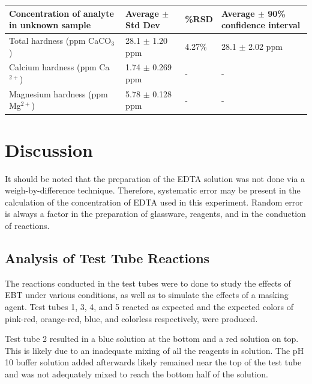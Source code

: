 \documentclass{article}
\begin{document}
\begin{center}
        \begin{tabular}{|L|L|L|L|}
                \hline
                \textbf{Concentration of analyte in unknown sample} &
                \textbf{Average \hspace{2cm}$\pm$ Std Dev} & \textbf{\%RSD} &
                \textbf{Average $\pm$ 90\% confidence interval} \\
                \hline
                Total hardness (ppm CaCO$_3$) & 28.1 $\pm$ 1.20 ppm & 4.27\% &
                28.1 $\pm$ 2.02 ppm \\
                \hline
                Calcium hardness (ppm Ca$^{2+}$) & 1.74 $\pm$ 0.269 ppm & - & - \\
                \hline
                Magnesium hardness \hspace{2cm} (ppm Mg$^{2+}$) & 5.78 $\pm$
                0.128 ppm & - & - \\
                \hline
        \end{tabular}
\end{center}

\section {Discussion}
It should be noted that the preparation of the EDTA solution was not done via a
weigh-by-difference technique. Therefore, systematic error may be present in the
calculation of the concentration of EDTA used in this experiment. Random error
is always a factor in the preparation of glassware, reagents, and in the
conduction of reactions.

\subsection {Analysis of Test Tube Reactions}
The reactions conducted in the test tubes were to done to study the effects of
EBT under various conditions, as well as to simulate the effects of a masking
agent. Test tubes 1, 3, 4, and 5 reacted as expected and the expected colors
of pink-red, orange-red, blue, and colorless respectively, were produced.

Test tube 2 resulted in a blue solution at the bottom and a red solution on top.
This is likely due to an inadequate mixing of all the reagents in solution. The
pH 10 buffer solution added afterwards likely remained near the top of the test
tube and was not adequately mixed to reach the bottom half of the solution.
\end{document}
